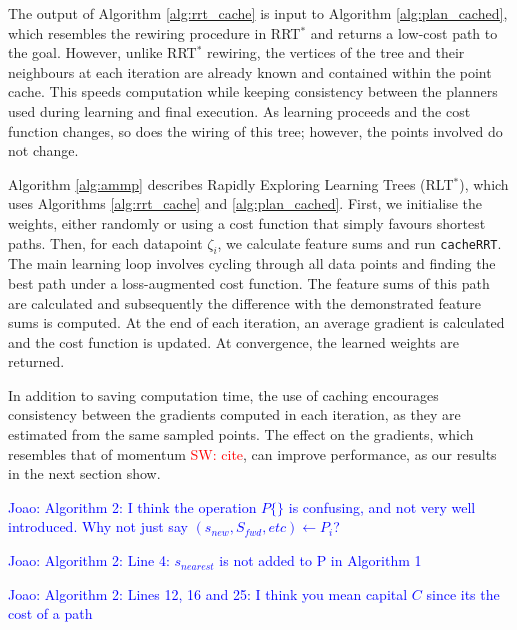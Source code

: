 \documentclass[letterpaper, 10 pt, conference]{ieeeconf}
\newcommand{\jm}[1]{\textcolor{blue}{Joao: #1}}
\newcommand{\sw}[1]{\textcolor{red}{SW: #1}}
\begin{document}
The output of Algorithm \ref{alg:rrt_cache} is input to Algorithm \ref{alg:plan_cached}, which resembles the rewiring procedure in RRT$^*$ \cite{karaman2011sampling} and returns a low-cost path to the goal. However, unlike RRT$^*$ rewiring, the vertices of the tree and their neighbours at each iteration are already known and contained within the point cache. This speeds computation while keeping consistency between the planners used during learning and final execution. As learning proceeds and the cost function changes, so does the wiring of this tree; however, the points involved do not change. %

Algorithm \ref{alg:ammp} describes Rapidly Exploring Learning Trees (RLT$^*$), which uses Algorithms \ref{alg:rrt_cache} and \ref{alg:plan_cached}. First, we initialise the weights, either randomly or using a cost function that simply favours shortest paths. Then, for each datapoint $\zeta_i$, we calculate feature sums and run \texttt{cacheRRT}. The main learning loop involves cycling through all data points and finding the best path under a loss-augmented cost function. The feature sums of this path are calculated and subsequently the difference with the demonstrated feature sums is computed. At the end of each iteration, an average gradient is calculated and the cost function is updated. At convergence, the learned weights are returned.

In addition to saving computation time, the use of caching encourages consistency between the gradients computed in each iteration, as they are estimated from the same sampled points.  The effect on the gradients, which resembles that of momentum \sw{cite}, can improve performance, as our results in the next section show.

\jm{Algorithm 2: I think the operation $P\{\}$ is confusing, and not very well introduced. Why not just say $(s_{new}, S_{fwd}, etc)\leftarrow P_i$?}

\jm{Algorithm 2: Line 4: $s_{nearest}$ is not added to P in Algorithm 1}

\jm{Algorithm 2: Lines 12, 16 and 25: I think you mean capital $C$ since its the cost of a path}
\end{document}
